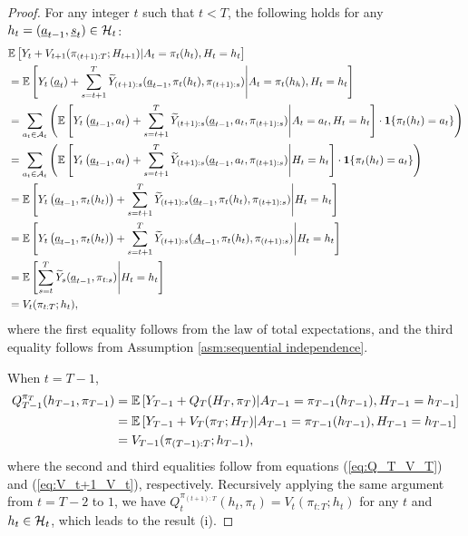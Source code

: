 \begin{proof}
For any integer $t$ such that $t <T$, the following holds for any $h_{t} = (\underline{a}_{t-1},\underline{s}_{t}) \in \mathcal{H}_{t}$:
\begin{align}
   & \mathbb{E}\left[Y_{t} + V_{t+1}(\pi_{(t+1):T};H_{t+1}) | A_{t}=\pi_{t}(h_{t}),H_{t}=h_{t}\right] \nonumber\\
      &=\mathbb{E}\left[Y_{t}\left(\underline{a}_{t}\right) + \sum_{s=t+1}^{T}\widetilde{Y}_{(t+1):s}(\underline{a}_{t-1},\pi_{t}(h_{t}),\pi_{(t+1):s})\middle| A_{t}=\pi_{t}(h_{h}),H_{t}=h_{t}\right] \nonumber \\
            &=\sum_{a_{t} \in \mathcal{A}_{t}}\left(\mathbb{E}\left[Y_{t}\left(\underline{a}_{t-1},a_{t}\right) + \sum_{s=t+1}^{T}\widetilde{Y}_{(t+1):s}(\underline{a}_{t-1},a_{t},\pi_{(t+1):s})\middle| A_{t}=a_{t},H_{t}=h_{t}\right] \cdot \mathbf{1}\{\pi_{t}(h_{t}) = a_{t}\}\right) \nonumber \\
             &=\sum_{a_{t} \in \mathcal{A}_{t}}\left(\mathbb{E}\left[Y_{t}\left(\underline{a}_{t-1},a_{t}\right) + \sum_{s=t+1}^{T}\widetilde{Y}_{(t+1):s}(\underline{a}_{t-1},a_{t},\pi_{(t+1):s})\middle| H_{t} = h_{t}\right] \cdot \mathbf{1}\{\pi_{t}(h_{t}) = a_{t}\}\right) \nonumber \\
            &=\mathbb{E}\left[Y_{t}\left(\underline{a}_{t-1},\pi_{t}(h_{t})\right) + \sum_{s=t+1}^{T}\widetilde{Y}_{(t+1):s}(\underline{a}_{t-1},\pi_{t}(h_{t}),\pi_{(t+1):s})\middle| H_{t}=h_{t}\right] \nonumber \\
        &=\mathbb{E}\left[Y_{t}\left(\underline{a}_{t-1},\pi_{t}(h_{t})\right) + \sum_{s=t+1}^{T}\widetilde{Y}_{(t+1):s}(\underline{A}_{t-1},\pi_{t}(h_{t}),\pi_{(t+1):s})\middle| H_{t}=h_{t}\right] \nonumber \\
   & =\mathbb{E}\left[\sum_{s=t}^{T}\widetilde{Y}_{s}(\underline{a}_{t-1},\pi_{t:s})\middle|H_{t} = h_{t}\right] \nonumber \\
   &=V_{t}(\pi_{t:T};h_{t}), \label{eq:V_t+1_V_t}
\end{align}
where the first equality follows from the law of total expectations, and the third equality follows from Assumption \ref{asm:sequential independence}. 

When $t=T-1$,
\begin{align*}
    Q_{T-1}^{\pi_{T}}(h_{T-1},\pi_{T-1})
    &= \mathbb{E}\left[Y_{T-1} + Q_{T}(H_{T},\pi_{T})|A_{T-1}=\pi_{T-1}(h_{T-1}),H_{T-1}=h_{T-1}\right] \\
    &= \mathbb{E}\left[Y_{T-1} + V_{T}(\pi_{T};H_{T})|A_{T-1}=\pi_{T-1}(h_{T-1}),H_{T-1}=h_{T-1}\right]\\
    &= V_{T-1}(\pi_{(T-1):T};h_{T-1}),
\end{align*}
where the second and third equalities follow from equations (\ref{eq:Q_T_V_T}) and (\ref{eq:V_t+1_V_t}), respectively. Recursively applying the same argument from $t=T-2$ to $1$, we have $Q_{t}^{\pi_{(t+1):T}}(h_{t},\pi_{t}) = V_{t}(\pi_{t:T};h_{t})$ for any $t$ and $h_{t} \in \mathcal{H}_{t}$,  which leads to the result (i). %


\end{proof}
